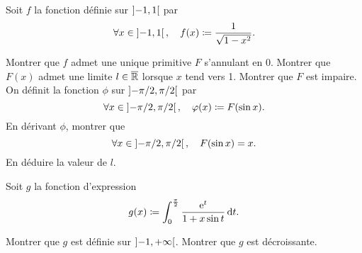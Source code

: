 \documentclass{magnolia}
\begin{document}





Soit $f$ la fonction définie sur $\left]-1,1\right[$ par
\[\forall x\in\left]-1,1\right[,\quad f(x)\coloneqq\frac{1}{\sqrt{1-x^2}}.\]

\begin{questions}
\question Montrer que $f$ admet une unique primitive $F$ s'annulant en 0.
\question Montrer que $F(x)$ admet une limite $l\in\overline{\mathbb{R}}$ lorsque $x$ tend vers 1.
\question Montrer que $F$ est impaire.
\enonce On définit la fonction $\phi$ sur $\left]-\pi/2,\pi/2\right[$ par
  \[\forall x\in\left]-\pi/2,\pi/2\right[,\quad \varphi(x)\coloneqq F(\sin x).\]
\question En dérivant $\phi$, montrer que
	\[\forall x\in\left]-\pi/2,\pi/2\right[,\quad F(\sin x)=x.\]
\question En déduire la valeur de $l$.
\end{questions}






Soit $g$ la fonction d'expression
\[g(x)\coloneqq\int_{0}^{\frac{\pi}{2}} \frac{{\rm e}^t}{1+x\sin t}\,\text{d}t.\]
\begin{questions}
\question Montrer que $g$ est définie sur $\left]-1,+\infty\right[$.
\question Montrer que $g$ est décroissante.
\end{questions}
\end{document}
